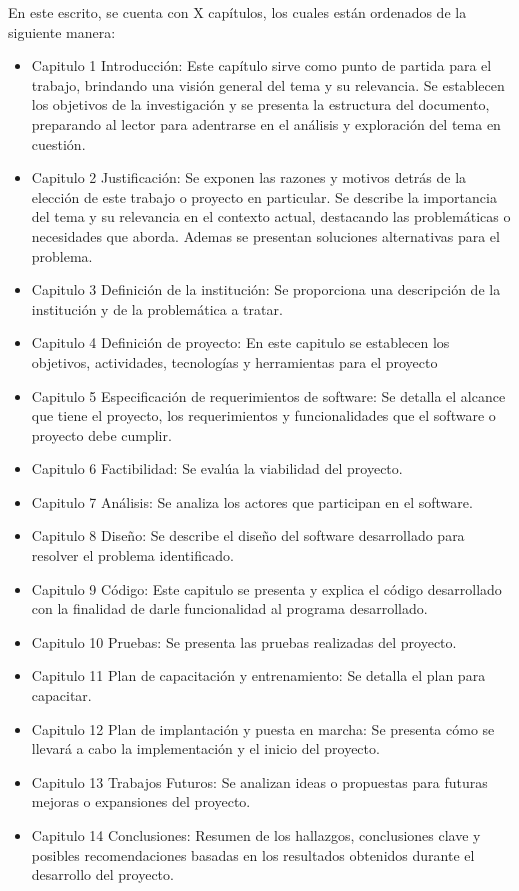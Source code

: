 En este escrito, se cuenta con X capítulos, los cuales están ordenados de la siguiente manera:
\begin{itemize}
    \item Capitulo 1 Introducción: Este capítulo sirve como punto de partida para el trabajo, brindando una visión general del tema y su relevancia. Se establecen los objetivos de la investigación y se presenta la estructura del documento, preparando al lector para adentrarse en el análisis y exploración del tema en cuestión.
    \item Capitulo 2 Justificación: Se exponen las razones y motivos detrás de la elección de este trabajo o proyecto en particular. Se describe la importancia del tema y su relevancia en el contexto actual, destacando las problemáticas o necesidades que aborda. Ademas se presentan soluciones alternativas para el problema.
    \item Capitulo 3 Definición de la institución: Se proporciona una descripción de la institución y de la problemática a tratar.
    \item Capitulo 4 Definición de proyecto: En este capitulo se establecen los objetivos, actividades, tecnologías y herramientas para el proyecto
    \item Capitulo 5 Especificación de requerimientos de software: Se detalla el alcance que tiene el proyecto, los requerimientos y funcionalidades que el software o proyecto debe cumplir.
    \item Capitulo 6 Factibilidad: Se evalúa la viabilidad del proyecto.
    \item Capitulo 7 Análisis: Se analiza los actores que participan en el software.
    \item Capitulo 8 Diseño: Se describe el diseño del software desarrollado para resolver el problema identificado.
    \item Capitulo 9 Código: Este capitulo se presenta y explica el código desarrollado con la finalidad de darle funcionalidad al programa desarrollado.
    \item Capitulo 10 Pruebas: Se presenta las pruebas realizadas del proyecto.
    \item Capitulo 11 Plan de capacitación y entrenamiento: Se detalla el plan para capacitar.
    \item Capitulo 12 Plan de implantación y puesta en marcha: Se presenta cómo se llevará a cabo la implementación y el inicio del proyecto.
    \item Capitulo 13 Trabajos Futuros: Se analizan ideas o propuestas para futuras mejoras o expansiones del proyecto.
    \item Capitulo 14 Conclusiones: Resumen de los hallazgos, conclusiones clave y posibles recomendaciones basadas en los resultados obtenidos durante el desarrollo del proyecto.
\end{itemize}
